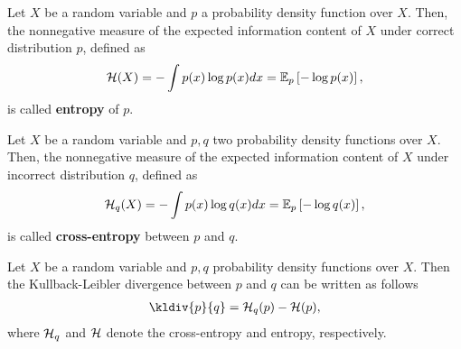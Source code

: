 \begin{definition}\label{def_entropy}
Let $X$ be a random variable and $p$ a probability density function over $X$. Then, the nonnegative measure of the expected information content of $X$ under correct distribution $p$, defined as
\begin{align}
\mathcal{H}(X) = -\int p(x) \log p(x)dx = \operatorname{\mathbb{E}}_p \left[ - \log p(x) \right],
\end{align}
is called \textbf{entropy} of $p$.
\end{definition}


\begin{definition}\label{def_cross_entropy}
Let $X$ be a random variable and $p, q$ two probability density functions over $X$. Then, the nonnegative measure of the expected information content of $X$ under incorrect distribution $q$, defined as
\begin{align}
\mathcal{H}_q(X) = -\int p(x) \log q(x)dx = \operatorname{\mathbb{E}}_p \left[ - \log q(x) \right],
\end{align}
is called \textbf{cross-entropy} between $p$ and $q$.
\end{definition}


\begin{remark}
Let $X$ be a random variable and $p, q$ probability density functions over $X$. Then the Kullback-Leibler divergence between $p$ and $q$ can be written as follows
\begin{align*}
\kldiv{p}{q} = \H_q(p) - \H(p),
\end{align*}
where $\mathcal{H}_q$ and $\mathcal{H}$ denote the cross-entropy and entropy, respectively.
\end{remark}
